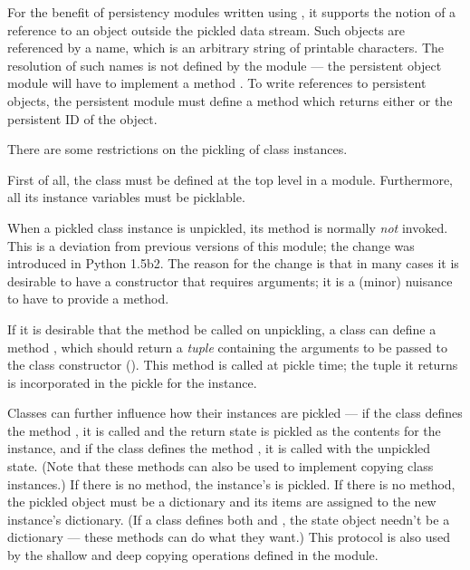 For the benefit of persistency modules written using , it
supports the notion of a reference to an object outside the pickled
data stream.  Such objects are referenced by a name, which is an
arbitrary string of printable \ASCII{} characters.  The resolution of
such names is not defined by the  module --- the
persistent object module will have to implement a method
.  To write references to persistent objects,
the persistent module must define a method  which
returns either  or the persistent ID of the object.

There are some restrictions on the pickling of class instances.

First of all, the class must be defined at the top level in a module.
Furthermore, all its instance variables must be picklable.


When a pickled class instance is unpickled, its  method
is normally \emph{not} invoked.   This is a deviation
from previous versions of this module; the change was introduced in
Python 1.5b2.  The reason for the change is that in many cases it is
desirable to have a constructor that requires arguments; it is a
(minor) nuisance to have to provide a  method.

If it is desirable that the  method be called on
unpickling, a class can define a method ,
which should return a \emph{tuple} containing the arguments to be
passed to the class constructor ().  This method is
called at pickle time; the tuple it returns is incorporated in the
pickle for the instance.

Classes can further influence how their instances are pickled --- if
the class
defines the method , it is called and the return
state is pickled as the contents for the instance, and if the class
defines the method , it is called with the
unpickled state.  (Note that these methods can also be used to
implement copying class instances.)  If there is no
 method, the instance's  is
pickled.  If there is no  method, the pickled
object must be a dictionary and its items are assigned to the new
instance's dictionary.  (If a class defines both 
and , the state object needn't be a dictionary
--- these methods can do what they want.)  This protocol is also used
by the shallow and deep copying operations defined in the
 module.

